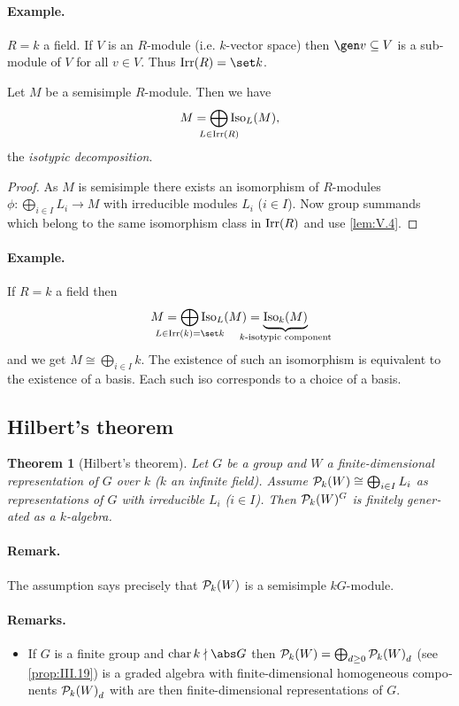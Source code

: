 \documentclass[12pt,a4paper]{scrartcl}
\theoremstyle{cplain}
\theoremstyle{cplain}
\newtheorem{thm}[thmcounter]{Theorem}
\theoremstyle{cplain}
\theoremstyle{definition}
\begin{document}
\begin{otherlanguage}{english}
\paragraph{Example.}
$R=k$ a field. If $V$ is an $R$-module (i.e. $k$-vector space) then $\gen v \subseteq V$ is a submodule of $V$ for all $v\in V$. Thus $\Irr(R) = \set k$.

\begin{lem}
  Let $M$ be a semisimple $R$-module. Then we have \[ M = \bigoplus_{\mathclap{L\in\Irr(R)}}\Iso_L(M), \] the \emph{isotypic decomposition}.
\end{lem}
\begin{proof}
  As $M$ is semisimple there exists an isomorphism of $R$-modules $ \phi\colon \bigoplus_{i\in I} L_i \to M $ with irreducible modules $L_i$ ($i \in I$). Now group summands which belong to the same isomorphism class in $\operatorname{Irr}(R)$ and use \cref{lem:V.4}.
\end{proof}

\paragraph{Example.}
If $R=k$ a field then \[ M = \bigoplus_{\mathclap{L\in\Irr(k) = \set k}}\Iso_L(M) = \underbrace{\Iso_k(M)}_{\mathclap{\text{$k$-isotypic component}}} \] and we get $M \cong \bigoplus_{i\in I}k$. The existence of such an isomorphism is equivalent to the existence of a basis. Each such iso corresponds to a choice of a basis.

\subsection{Hilbert's theorem}
\begin{thm}[Hilbert's theorem] \label{thm:hilbert}
  Let $G$ be a group and $W$ a finite-dimensional representation of $G$ over $k$ ($k$ an infinite field). Assume $\mathcal{P}_k(W) \cong \bigoplus_{i\in I}L_i$ as representations of $G$ with irreducible $L_i$ ($i\in I$). Then $\mathcal{P}_k(W)^G$ is finitely generated as a $k$-algebra.
\end{thm}

\paragraph{Remark.}
The assumption says precisely that $\mathcal{P}_k(W)$ is a semisimple $kG$-module.

\paragraph{Remarks.}
\begin{itemize}
  \item If $G$ is a finite group and $\chr k\nmid \abs G$ then $\mathcal{P}_k(W) = \bigoplus_{d\ge 0}{\mathcal{P}_k(W)}_d$ (see \cref{prop:III.19}) is a graded algebra with finite-dimensional homogeneous components ${\mathcal{P}_k(W)}_d$ with are then finite-dimensional representations of $G$.
  

\end{itemize}
\end{otherlanguage}
\end{document}
